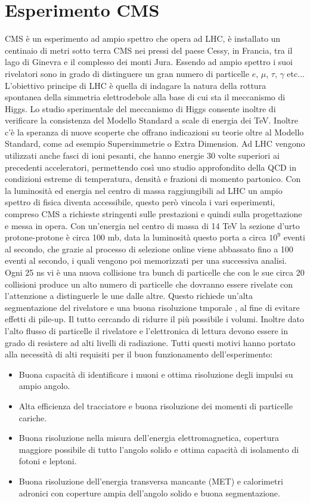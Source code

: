 \section{Esperimento CMS}
CMS è un esperimento ad ampio spettro che opera ad LHC, è installato un centinaio di metri sotto terra CMS nei pressi del paese Cessy, in Francia, tra il lago di Ginevra e il complesso dei monti Jura. Essendo ad ampio spettro i suoi rivelatori sono in grado di distinguere un gran numero di particelle $e$, $\mu$, $\tau$, $\gamma$ etc...
L'obiettivo principe di LHC è quella di indagare la natura della rottura spontanea della simmetria elettrodebole alla base di cui sta il meccanismo di Higgs. Lo studio sperimentale del meccanismo di Higgs consente inoltre di verificare la consistenza del Modello Standard a scale di energia dei TeV. Inoltre c'è la speranza di nuove scoperte che offrano indicazioni su teorie oltre al Modello Standard, come ad esempio Supersimmetrie o Extra Dimension.
Ad LHC vengono utilizzati anche fasci di ioni pesanti, che hanno energie 30 volte superiori ai precedenti acceleratori, permettendo così uno studio approfondito della QCD in condizioni estreme di temperatura, densità e frazioni di momento partonico. Con la luminosità ed energia nel centro di massa raggiungibili ad LHC un ampio spettro di fisica diventa accessibile, questo però vincola i vari esperimenti, compreso CMS a richieste stringenti sulle prestazioni e quindi sulla progettazione e messa in opera.
Con un'energia nel centro di massa di 14 TeV la sezione d'urto protone-protone è circa 100 mb, data la  luminosità questo porta a circa $10^9$ eventi al secondo, che grazie al processo di selezione online viene abbassato fino a 100 eventi al secondo, i quali vengono poi memorizzati per una successiva analisi. 
Ogni 25 ns vi è una nuova collisione tra bunch di particelle che con le sue circa 20 collisioni produce un alto numero di particelle che dovranno essere rivelate con l'attenzione a distinguerle le une dalle altre. Questo richiede un'alta segmentazione del rivelatore e una buona risoluzione tmporale , al fine di evitare effetti di pile-up. Il tutto cercando di ridurre il più possibile i volumi.
Inoltre dato l'alto flusso di particelle il rivelatore e l'elettronica di lettura devono essere in grado di resistere ad alti livelli di radiazione. Tutti questi motivi hanno  portato alla necessità di alti requisiti per il buon funzionamento dell'esperimento:
\begin{itemize}
\item Buona capacità di identificare i muoni e ottima risoluzione degli impulsi su ampio angolo.
\item Alta efficienza del tracciatore e buona risoluzione dei momenti di particelle cariche.
\item Buona risoluzione nella misura dell'energia elettromagnetica, copertura maggiore possibile di tutto l'angolo solido e ottima capacità di isolamento di fotoni e leptoni.
\item Buona risoluzione dell'energia transversa mancante (MET) e calorimetri adronici con coperture ampia dell'angolo solido e buona segmentazione.
\end{itemize}

